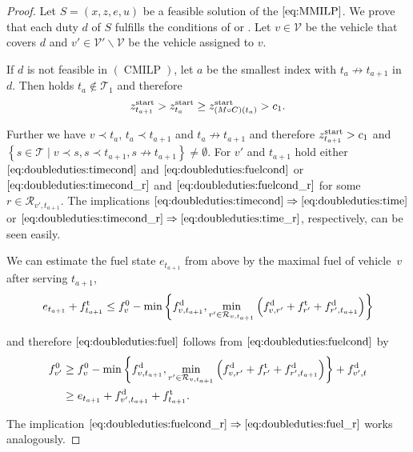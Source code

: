 \begin{proof}

Let $S=\left(x,z,e,u\right)$ be a feasible solution of the $\eqref{eq:MMILP}$. We prove that each duty $d$ of $S$ fulfills the conditions of  or . Let ${v\in\mathcal{V}}$ be the vehicle that covers $d$ and ${v'\in\mathcal{V}'\backslash\mathcal{V}}$ be the vehicle assigned to $v$.

If $d$ is not feasible in $(\operatorname{CMILP})$, let $a$ be the smallest index with ${t_a\not\to t_{a+1}}$ in $d$. Then holds ${t_a\not\in\mathcal{T}_1}$ and therefore
\begin{align*}
	 z^{\operatorname{start}}_{t_{a+1}} > z^{\operatorname{start}}_{t_a} \geq z^{\operatorname{start}}_{\left(M\circ C\right)\left(t_a\right)} > c_1.
\end{align*}

Further we have $v\prec t_a$, $t_a\prec t_{a+1}$ and $t_a\not\to t_{a+1}$ and therefore ${z^{\operatorname{start}}_{t_{a+1}}>c_1}$ and ${\left\{s\in\mathcal{T}\mid v\prec s, s\prec t_{a+1}, s\not\to t_{a+1}\right\}\neq\emptyset}$. For $v'$ and $t_{a+1}$ hold either $\eqref{eq:doubleduties:timecond}$ and $\eqref{eq:doubleduties:fuelcond}$ or $\eqref{eq:doubleduties:timecond_r}$ and $\eqref{eq:doubleduties:fuelcond_r}$ for some ${r\in\mathcal{R}_{v',t_{a+1}}}$. The implications ${\eqref{eq:doubleduties:timecond}\Rightarrow\eqref{eq:doubleduties:time}}$ or\linebreak
${\eqref{eq:doubleduties:timecond_r}\Rightarrow\eqref{eq:doubleduties:time_r}}$, respectively, can be seen easily.

We can estimate the fuel state $e_{t_{a+1}}$ from above by the maximal fuel of vehicle~$v$ after serving $t_{a+1}$, \ie
\begin{align*}
	e_{t_{a+1}} + f^{\operatorname{t}}_{t_{a+1}} \leq f^0_v - \min\left\{f^{\operatorname{d}}_{v,t_{a+1}}, \min_{r'\in\mathcal{R}_{v,t_{a+1}}}\left(f^{\operatorname{d}}_{v,r'}+f^{\operatorname{t}}_{r'}+f^{\operatorname{d}}_{r',t_{a+1}}\right)\right\}
\end{align*}

and therefore $\eqref{eq:doubleduties:fuel}$ follows from $\eqref{eq:doubleduties:fuelcond}$ by
\begin{align*}
	f^0_{v'} & \geq f^0_v - \min\left\{f^{\operatorname{d}}_{v,t_{a+1}}, \min_{r'\in\mathcal{R}_{v,t_{a+1}}}\left(f^{\operatorname{d}}_{v,r'}+f^{\operatorname{t}}_{r'}+f^{\operatorname{d}}_{r',t_{a+1}}\right)\right\} + f^{\operatorname{d}}_{v',t} \\
	& \geq e_{t_{a+1}} + f^{\operatorname{d}}_{v',t_{a+1}} + f^{\operatorname{t}}_{t_{a+1}}.
\end{align*}

The implication ${\eqref{eq:doubleduties:fuelcond_r}\Rightarrow\eqref{eq:doubleduties:fuel_r}}$ works analogously.


\end{proof}
